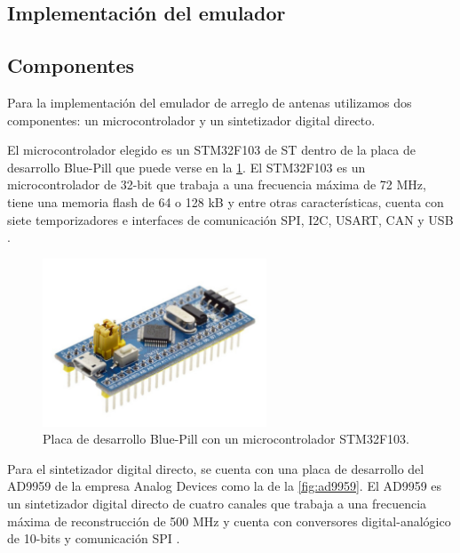 \documentclass{article}
\newenvironment{standalone}{\begin{preview}}{\end{preview}}
\begin{document}
\begin{standalone}
  \section{Implementación del emulador}

  \subsection{Componentes}

  Para la implementación del emulador de arreglo de antenas utilizamos dos componentes: un microcontrolador y un sintetizador digital directo.

  El microcontrolador elegido es un STM32F103 de ST dentro de la placa de desarrollo Blue-Pill que puede verse en la \cref{fig:blue-pill}.
  El STM32F103 es un microcontrolador de 32-bit que trabaja a una frecuencia máxima de 72 MHz, tiene una memoria flash de 64 o 128 kB y entre otras características, cuenta con siete temporizadores e interfaces de comunicación SPI, I2C, USART, CAN y USB \cite{STM32F103_datasheet}.

  \begin{figure}[!htbp]
    \centering
    \includegraphics[width=\linewidth, height=50mm, keepaspectratio]{../images/bluepill-stm32.jpg}
    \caption{Placa de desarrollo Blue-Pill con un microcontrolador STM32F103.}
    \label{fig:blue-pill}
  \end{figure}

  Para el sintetizador digital directo, se cuenta con una placa de desarrollo del AD9959 de la empresa Analog Devices como la de la \cref{fig:ad9959}.
  El AD9959 es un sintetizador digital directo de cuatro canales que trabaja a una frecuencia máxima de reconstrucción de 500 MHz y cuenta con conversores digital-analógico de 10-bits y comunicación SPI \cite{ad9959_datasheet}.


\end{standalone}
\end{document}
